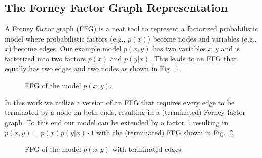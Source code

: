 \subsection{The Forney Factor Graph Representation}
A Forney factor graph (FFG) is a neat tool to represent a factorized probabilistic model where probabilistic factors (e.g., \(p(x)\)) become nodes and variables (e.g., \(x\)) become edges. Our example model \(p(x,y)\) has two variables \(x,y\) and is factorized into two factors \(p(x)\) and \(p(y|x)\). This leads to an FFG that equally has two edges and two nodes as shown in Fig.~\ref{fig:1}.
\begin{figure}[htbp]
    \centering


    \caption{FFG of the model \(p(x,y)\).}
    \label{fig:1}
\end{figure}

In this work we utilize a version of an FFG that requires every edge to be terminated by a node on both ends, resulting in a (terminated) Forney factor graph. To this end our model can be extended by a factor 1 resulting in \(p(x,y)=p(x)p(y|x)\cdot1\) with the (terminated) FFG shown in Fig.~\ref{fig:2}
\begin{figure}[htbp]
    \centering


    \caption{FFG of the model \(p(x,y)\) with terminated edges.}
    \label{fig:2}
\end{figure}

